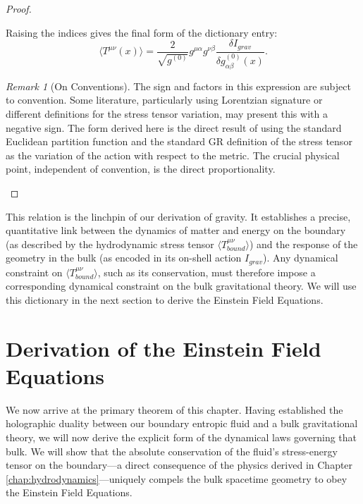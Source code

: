 \documentclass[11pt, letterpaper]{report}
\theoremstyle{plain} %
\theoremstyle{definition} %
\theoremstyle{remark} %
\newtheorem{remark}{Remark}[chapter]
\begin{document}
\begin{proof}
\begin{enumerate}
\begin{equation}
    \end{equation}
    Raising the indices gives the final form of the dictionary entry:
    \begin{equation}
        \boxed{\langle T^{\mu\nu}(x) \rangle = \frac{2}{\sqrt{g^{(0)}}} g^{\mu\alpha} g^{\nu\beta} \frac{\delta I_{grav}}{\delta g^{(0)}_{\alpha\beta}(x)}.}
        \label{eq:final_holographic_dictionary}
    \end{equation}
    \begin{remark}[On Conventions]
    The sign and factors in this expression are subject to convention. Some literature, particularly using Lorentzian signature or different definitions for the stress tensor variation, may present this with a negative sign. The form derived here is the direct result of using the standard Euclidean partition function and the standard GR definition of the stress tensor as the variation of the action with respect to the metric. The crucial physical point, independent of convention, is the direct proportionality.
    \end{remark}
\end{enumerate}
\end{proof}

This relation is the linchpin of our derivation of gravity. It establishes a precise, quantitative link between the dynamics of matter and energy on the boundary (as described by the hydrodynamic stress tensor $\langle T^{\mu\nu}_{bound} \rangle$) and the response of the geometry in the bulk (as encoded in its on-shell action $I_{grav}$). Any dynamical constraint on $\langle T^{\mu\nu}_{bound} \rangle$, such as its conservation, must therefore impose a corresponding dynamical constraint on the bulk gravitational theory. We will use this dictionary in the next section to derive the Einstein Field Equations.





\section{Derivation of the Einstein Field Equations}
\label{sec:efe_derivation_from_hydro}

We now arrive at the primary theorem of this chapter. Having established the holographic duality between our boundary entropic fluid and a bulk gravitational theory, we will now derive the explicit form of the dynamical laws governing that bulk. We will show that the absolute conservation of the fluid's stress-energy tensor on the boundary—a direct consequence of the physics derived in Chapter \ref{chap:hydrodynamics}—uniquely compels the bulk spacetime geometry to obey the Einstein Field Equations.
\end{document}

